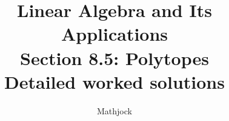 
\title{\textbf{Linear Algebra and Its Applications}\\[0.3em]Section 8.5: Polytopes\\[0.3em]\large Detailed worked solutions}
\author{Mathjock}
\date{}

\maketitle
\bookinfo
\tableofcontents
\clearpage
\renewcommand{\thesection}{8.\arabic{section}}
\renewcommand{\theHsection}{8.\arabic{section}}
\setcounter{section}{4}



